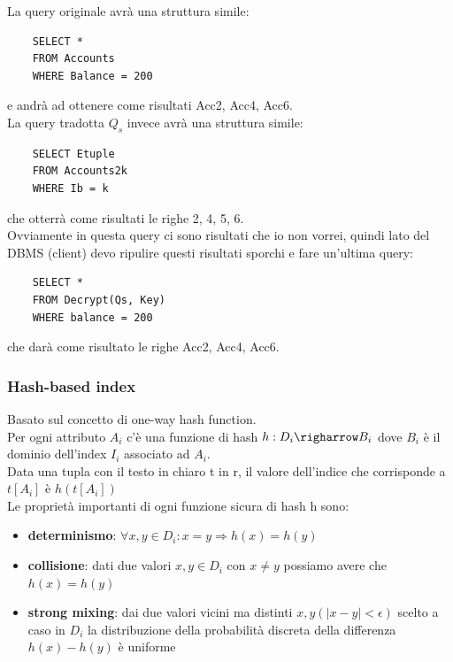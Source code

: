 La query originale avrà una struttura simile:
\begin{verbatim}
    SELECT *
    FROM Accounts
    WHERE Balance = 200
\end{verbatim}
e andrà ad ottenere come risultati Acc2, Acc4, Acc6.\\
La query tradotta \(Q_s\) invece avrà una struttura simile:
\begin{verbatim}
    SELECT Etuple
    FROM Accounts2k
    WHERE Ib = k
\end{verbatim}
che otterrà come risultati le righe 2, 4, 5, 6.\\
Ovviamente in questa query ci sono risultati che io non vorrei, quindi lato del DBMS (client) devo ripulire questi risultati sporchi e fare un'ultima query:
\begin{verbatim}
    SELECT *
    FROM Decrypt(Qs, Key)
    WHERE balance = 200
\end{verbatim}
che darà come risultato le righe Acc2, Acc4, Acc6.

\subsubsection{Hash-based index}
Basato sul concetto di one-way hash function.\\
Per ogni attributo \(A_i\) c'è una funzione di hash \(h : D_i \righarrow B_i\) dove \(B_i\) è il dominio dell'index \(I_i\) associato ad \(A_i\).\\
Data una tupla con il testo in chiaro t in r, il valore dell'indice che corrisponde a \(t[A_i]\) è \(h(t[A_i])\)\\
Le proprietà importanti di ogni funzione sicura di hash h sono:
\begin{itemize}
    \item \textbf{determinismo}: \( \forall x,y \in D_i: x = y \Longrightarrow h(x) = h(y) \)
    \item \textbf{collisione}: dati due valori \( x,y \in D_i\) con \(x \neq y\) possiamo avere che \(h(x) = h(y)\)
    \item \textbf{strong mixing}: dai due valori vicini ma distinti \(x,y (|x - y| < \epsilon) \) scelto a caso in \(D_i\) la distribuzione della probabilità discreta della differenza \(h(x) - h(y)\) è uniforme
\end{itemize}

